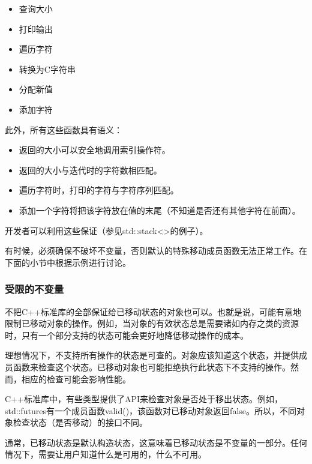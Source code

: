 \begin{itemize}
	\item 查询大小
	\item 打印输出
	\item 遍历字符
	\item 转换为C字符串
	\item 分配新值
	\item 添加字符
\end{itemize}

此外，所有这些函数具有语义：

\begin{itemize}
	\item 返回的大小可以安全地调用索引操作符。
	\item 返回的大小与迭代时的字符数相匹配。
	\item 遍历字符时，打印的字符与字符序列匹配。
	\item 添加一个字符将把该字符放在值的末尾（不知道是否还有其他字符在前面）。
\end{itemize}

开发者可以利用这些保证（参见std::stack<>的例子）。

有时候，必须确保不破坏不变量，否则默认的特殊移动成员函数无法正常工作。在下面的小节中根据示例进行讨论。

\subsubsection{受限的不变量}

不把C++标准库的全部保证给已移动状态的对象也可以。也就是说，可能有意地限制已移动对象的操作。例如，当对象的有效状态总是需要诸如内存之类的资源时，只有一个部分支持的状态可能会更好地降低移动操作的成本。

理想情况下，不支持所有操作的状态是可查的。对象应该知道这个状态，并提供成员函数来检查这个状态。已移动对象也可能拒绝执行此状态下不支持的操作。然而，相应的检查可能会影响性能。

C++标准库中，有些类型提供了API来检查对象是否处于移出状态。例如，std::futures有一个成员函数valid()，该函数对已移动对象返回false。所以，不同对象检查状态（是否移动）的接口不同。

通常，已移动状态是默认构造状态，这意味着已移动状态是不变量的一部分。任何情况下，需要让用户知道什么是可用的，什么不可用。





